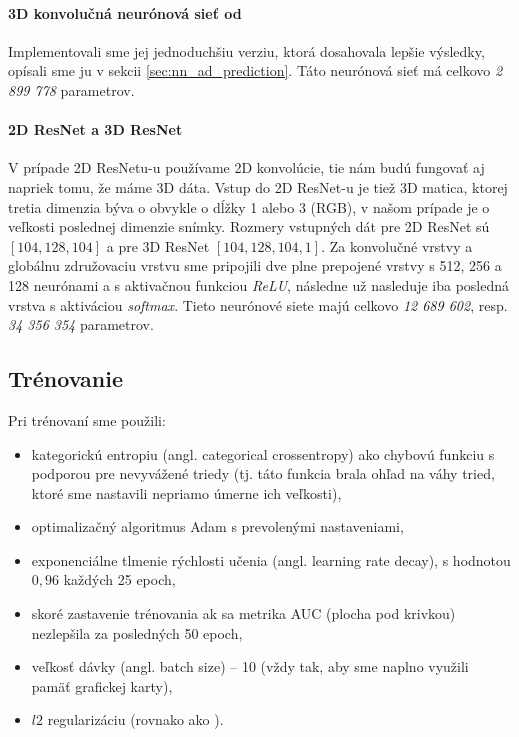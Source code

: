 \paragraph{3D konvolučná neurónová sieť od \citeauthor*{esmaeilzadeh2018end}} Implementovali sme jej jednoduchšiu verziu, ktorá dosahovala lepšie výsledky, opísali sme ju v sekcii \ref{sec:nn_ad_prediction}. Táto neurónová sieť má celkovo \textit{2 899 778} parametrov.

\paragraph{2D ResNet a 3D ResNet} V prípade 2D ResNetu-u používame 2D konvolúcie, tie nám budú fungovať aj napriek tomu, že máme 3D dáta. Vstup do 2D ResNet-u je tiež 3D matica, ktorej tretia dimenzia býva o obvykle o dĺžky 1 alebo 3 (RGB), v našom prípade je o veľkosti poslednej dimenzie snímky. Rozmery vstupných dát pre 2D ResNet sú $[104, 128, 104]$ a pre 3D ResNet $[104, 128, 104, 1]$. Za konvolučné vrstvy a globálnu združovaciu vrstvu sme pripojili dve plne prepojené vrstvy s 512, 256 a 128 neurónami a s aktivačnou funkciou \textit{ReLU}, následne už nasleduje iba posledná vrstva s aktiváciou \textit{softmax}. Tieto neurónové siete majú celkovo \textit{12 689 602}, resp. \textit{34 356 354} parametrov.


\subsection{Trénovanie}

Pri trénovaní sme použili:

\begin{itemize}
    \item kategorickú entropiu (angl. categorical crossentropy) ako chybovú funkciu s podporou pre nevyvážené triedy (tj. táto funkcia brala ohľad na váhy tried, ktoré sme nastavili nepriamo úmerne ich veľkosti),
    \item optimalizačný algoritmus Adam s prevolenými nastaveniami,
    \item exponenciálne tlmenie rýchlosti učenia (angl. learning rate decay), s hodnotou $0,96$ každých 25 epoch,
    \item skoré zastavenie trénovania ak sa metrika AUC (plocha pod krivkou) nezlepšila za posledných 50 epoch,
    \item veľkosť dávky (angl. batch size) -- 10 (vždy tak, aby sme naplno využili pamäť grafickej karty),
    \item $l2$ regularizáciu (rovnako ako \citeauthor*{esmaeilzadeh2018end}).
\end{itemize}


